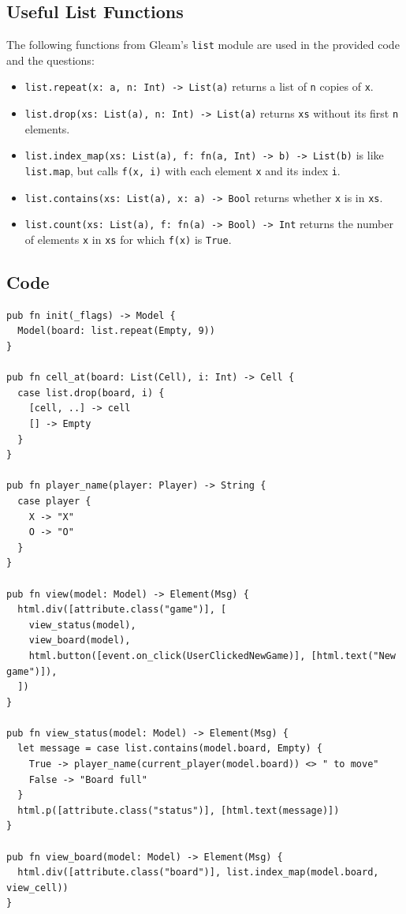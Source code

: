 \subsection*{Useful List Functions}

The following functions from Gleam's \texttt{list} module are used in the provided code and the questions:
{\sloppy
\begin{itemize}
  \item \lstinline{list.repeat(x: a, n: Int) -> List(a)} returns a list of \texttt{n} copies of \texttt{x}.
  \item \lstinline{list.drop(xs: List(a), n: Int) -> List(a)} returns \texttt{xs} without its first \texttt{n} elements.
  \item \lstinline{list.index_map(xs: List(a), f: fn(a, Int) -> b) -> List(b)} is like \lstinline{list.map}, but calls \lstinline{f(x, i)} with each element \texttt{x} and its index \texttt{i}.
  \item \lstinline{list.contains(xs: List(a), x: a) -> Bool} returns whether \texttt{x} is in \texttt{xs}.
  \item \lstinline{list.count(xs: List(a), f: fn(a) -> Bool) -> Int} returns the number of elements \texttt{x} in \texttt{xs} for which \lstinline{f(x)} is \lstinline{True}.
\end{itemize}
\par}

\newpage
\subsection*{Code}

\begin{lstlisting}
pub fn init(_flags) -> Model {
  Model(board: list.repeat(Empty, 9))
}

pub fn cell_at(board: List(Cell), i: Int) -> Cell {
  case list.drop(board, i) {
    [cell, ..] -> cell
    [] -> Empty
  }
}

pub fn player_name(player: Player) -> String {
  case player {
    X -> "X"
    O -> "O"
  }
}

pub fn view(model: Model) -> Element(Msg) {
  html.div([attribute.class("game")], [
    view_status(model),
    view_board(model),
    html.button([event.on_click(UserClickedNewGame)], [html.text("New game")]),
  ])
}

pub fn view_status(model: Model) -> Element(Msg) {
  let message = case list.contains(model.board, Empty) {
    True -> player_name(current_player(model.board)) <> " to move"
    False -> "Board full"
  }
  html.p([attribute.class("status")], [html.text(message)])
}

pub fn view_board(model: Model) -> Element(Msg) {
  html.div([attribute.class("board")], list.index_map(model.board, view_cell))
}
\end{lstlisting}
